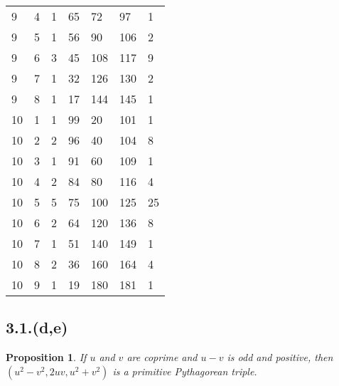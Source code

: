 \documentclass[letterpaper, 12pt]{memoir}
\theoremstyle{mystyle}
\newtheorem*{prop}{Proposition}
\begin{document}
\begin{table}[h!]
\begin{tabular}{|l l l|l l l l|}
    9 & 4 & 1 & 65 & 72 & 97 & 1 \\
    9 & 5 & 1 & 56 & 90 & 106 & 2 \\
    9 & 6 & 3 & 45 & 108 & 117 & 9 \\
    9 & 7 & 1 & 32 & 126 & 130 & 2 \\
    9 & 8 & 1 & 17 & 144 & 145 & 1 \\
    10 & 1 & 1 & 99 & 20 & 101 & 1 \\
    10 & 2 & 2 & 96 & 40 & 104 & 8 \\
    10 & 3 & 1 & 91 & 60 & 109 & 1 \\
    10 & 4 & 2 & 84 & 80 & 116 & 4 \\
    10 & 5 & 5 & 75 & 100 & 125 & 25 \\
    10 & 6 & 2 & 64 & 120 & 136 & 8 \\
    10 & 7 & 1 & 51 & 140 & 149 & 1 \\
    10 & 8 & 2 & 36 & 160 & 164 & 4 \\
    10 & 9 & 1 & 19 & 180 & 181 & 1 \\
    \hline
\end{tabular}
\end{table}


\subsection*{3.1.(d,e)}
\begin{prop}
    If $u$ and $v$ are coprime and $u-v$ is odd and positive, then $(u^2-v^2,
    2uv, u^2+v^2)$ is a primitive Pythagorean triple.
\end{prop}
\end{document}
